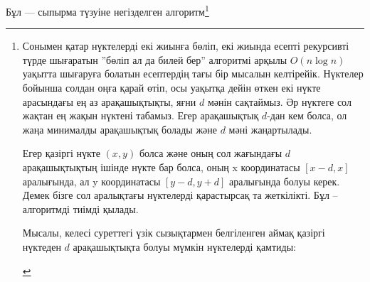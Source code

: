 Бұл –– сыпырма түзуіне негізделген алгоритм\footnote{Сонымен қатар 
нүктелерді екі жиынға бөліп, екі жиында есепті рекурсивті түрде шығаратын
''бөліп ал да билей бер'' алгоритмі \cite{sha75} арқылы 
$O(n \log n)$ уақытта шығаруға болатын
есептердің тағы бір мысалын келтірейік. Нүктелер бойынша 
солдан оңға қарай өтіп, осы уақытқа дейін 
өткен екі нүкте арасындағы ең аз 
арақашықтықты, яғни $d$ мәнін сақтаймыз. 
Әр нүктеге сол жақтан ең жақын нүктені табамыз. 
Егер арақашықтық $d$-дан кем болса, ол жаңа 
минималды арақашықтық болады және $d$ мәні
жаңартылады. 


Егер қазіргі нүкте $(x,y)$ болса
және оның сол жағындағы $d$ арақашықтықтың
ішінде нүкте бар болса, оның x координатасы
$[x-d,x]$ аралығында, ал y координатасы
$[y-d,y+d]$ аралығында болуы керек. Демек бізге 
сол аралықтағы нүктелерді қарастырсақ та жеткілікті.  
Бұл -- алгоритмді тиімді қылады. 


Мысалы, келесі суреттегі 
үзік сызықтармен белгіленген аймақ 
қазіргі нүктеден $d$ арақашықтықта болуы мүмкін нүктелерді қамтиды:


\begin{center}
\end{center}}
